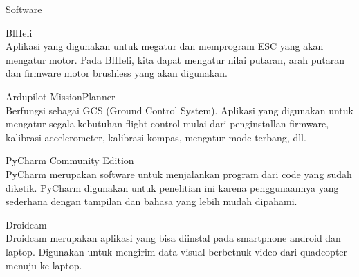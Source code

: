 \begin{packed_enum}
	\item Software
	\begin{packed_item}
		\item [a.] BlHeli
		\\ Aplikasi yang digunakan untuk megatur dan memprogram ESC yang akan mengatur motor. Pada BlHeli, kita dapat mengatur nilai putaran, arah putaran dan firmware motor brushless yang akan digunakan.
		\item [b.] Ardupilot MissionPlanner
		\\ Berfungsi sebagai GCS (Ground Control System). Aplikasi yang digunakan untuk mengatur segala kebutuhan flight control mulai dari penginstallan firmware, kalibrasi accelerometer, kalibrasi kompas, mengatur mode terbang, dll.
		\item [c.] PyCharm Community Edition
		\\ PyCharm merupakan software untuk menjalankan program dari code yang sudah diketik. PyCharm digunakan untuk penelitian ini karena penggunaannya yang sederhana dengan tampilan dan bahasa yang lebih mudah dipahami.
		\item [d.] Droidcam
		\\ Droidcam merupakan aplikasi yang bisa diinstal pada smartphone android dan laptop. Digunakan untuk mengirim data visual berbetnuk video dari quadcopter menuju ke laptop.
	\end{packed_item}
	

\end{packed_enum}
